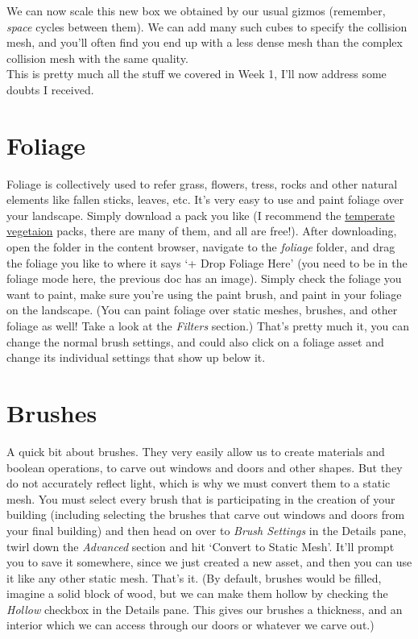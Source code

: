 \documentclass{article}
\begin{document}
\newpage

We can now scale this new box we obtained by our usual gizmos (remember, \emph{space} cycles between them). We can add many such cubes to specify the collision mesh, and you'll often find you end up with a less dense mesh than the complex collision mesh with the same quality.
\\[10pt]
This is pretty much all the stuff we covered in Week 1, I'll now address some doubts I received.

\section{Foliage}

Foliage is collectively used to refer grass, flowers, tress, rocks and other natural elements like fallen sticks, leaves, etc. It's very easy to use and paint foliage over your landscape. Simply download a pack you like (I recommend the \href{https://fab.com/s/f294bc8824ff}{temperate vegetaion} packs, there are many of them, and all are free!). After downloading, open the folder in the content browser, navigate to the \emph{foliage} folder, and drag the foliage you like to where it says `+ Drop Foliage Here' (you need to be in the foliage mode here, the previous doc has an image). Simply check the foliage you want to paint, make sure you're using the paint brush, and paint in your foliage on the landscape. (You can paint foliage over static meshes, brushes, and other foliage as well! Take a look at the \emph{Filters} section.)
That's pretty much it, you can change the normal brush settings, and could also click on a foliage asset and change its individual settings that show up below it.

\section{Brushes}
A quick bit about brushes. They very easily allow us to create materials and boolean operations, to carve out windows and doors and other shapes. But they do not accurately reflect light, which is why we must convert them to a static mesh. You must select every brush that is participating in the creation of your building (including selecting the brushes that carve out windows and doors from your final building) and then head on over to \emph{Brush Settings} in the Details pane, twirl down the \emph{Advanced} section and hit `Convert to Static Mesh'. It'll prompt you to save it somewhere, since we just created a new asset, and then you can use it like any other static mesh. That's it.
(By default, brushes would be filled, imagine a solid block of wood, but we can make them hollow by checking the \emph{Hollow} checkbox in the Details pane. This gives our brushes a thickness, and an interior which we can access through our doors or whatever we carve out.)
\end{document}
